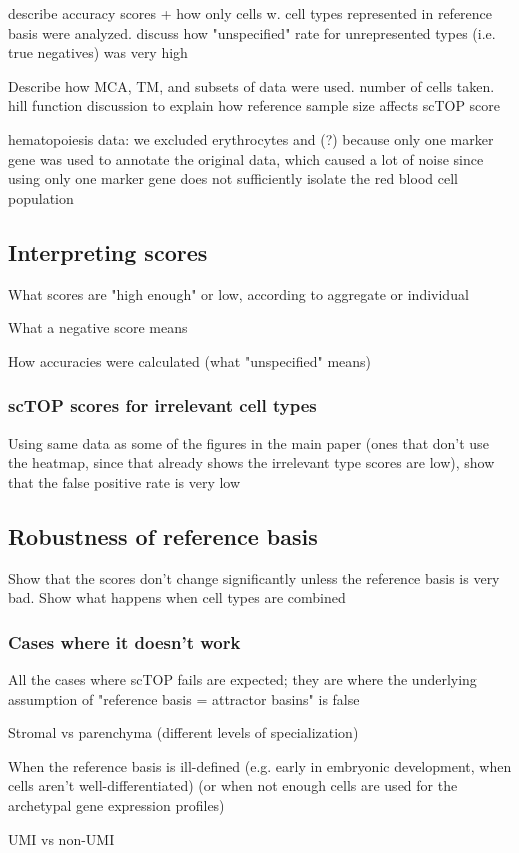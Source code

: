 \documentclass[aps,superscriptaddress, notitlepage,longbibliography]{revtex4-1}
\begin{document}
describe accuracy scores + how only cells w. cell types represented in reference basis were analyzed. discuss how "unspecified" rate for unrepresented types (i.e. true negatives) was very high

Describe how MCA, TM, and subsets of data were used. number of cells taken. hill function discussion to explain how reference sample size affects scTOP score

hematopoiesis data: we excluded erythrocytes and (?) because only one marker gene was used to annotate the original data, which caused a lot of noise since using only one marker gene does not sufficiently isolate the red blood cell population

\subsection{Interpreting scores}
What scores are "high enough" or low, according to aggregate or individual

What a negative score means

How accuracies were calculated (what "unspecified" means)

\subsubsection{scTOP scores for irrelevant cell types}
Using same data as some of the figures in the main paper (ones that don't use the heatmap, since that already shows the irrelevant type scores are low), show that the false positive rate is very low

\subsection{Robustness of reference basis}
Show that the scores don't change significantly unless the reference basis is very bad. Show what happens when cell types are combined

\subsubsection{Cases where it doesn't work}\label{failure_cases}
All the cases where scTOP fails are expected; they are where the underlying assumption of "reference basis = attractor basins" is false

Stromal vs parenchyma (different levels of specialization)

When the reference basis is ill-defined (e.g. early in embryonic development, when cells aren't well-differentiated) (or when not enough cells are used for the archetypal gene expression profiles)

UMI vs non-UMI


\end{document}
